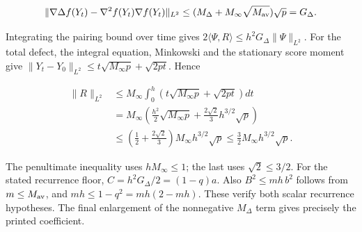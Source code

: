 \documentclass[11pt,a4paper]{article}
\begin{document}
\[\|\nabla\Delta f(Y_t)-\nabla^2f(Y_t)\nabla f(Y_t)\|_{L^2}\le(M_\Delta+M_\infty\sqrt{M_{\rm av}})\sqrt p=G_\Delta.\]

Integrating the pairing bound over time gives \(2\langle\Psi,R\rangle\le h^2G_\Delta\|\Psi\|_{L^2}\). For the total defect, the integral equation, Minkowski and the stationary score moment give \(\|Y_t-Y_0\|_{L^2}\le t\sqrt{M_\infty p}+\sqrt{2pt}\). Hence

\[\begin{aligned}\|R\|_{L^2}&\le M_\infty\int_0^h\left(t\sqrt{M_\infty p}+\sqrt{2pt}\right)dt\\&=M_\infty\left(\frac{h^2}2\sqrt{M_\infty p}+\frac{2\sqrt2}3h^{3/2}\sqrt p\right)\\&\le\left(\frac12+\frac{2\sqrt2}3\right)M_\infty h^{3/2}\sqrt p\le\frac32M_\infty h^{3/2}\sqrt p.\end{aligned}\]

The penultimate inequality uses \(hM_\infty\le1\); the last uses \(\sqrt2\le3/2\). For the stated recurrence floor, \(C=h^2G_\Delta/2=(1-q)a\). Also \(B^2\le mh\,b^2\) follows from \(m\le M_{\rm av}\), and \(mh\le1-q^2=mh(2-mh)\). These verify both scalar recurrence hypotheses. The final enlargement of the nonnegative \(M_\Delta\) term gives precisely the printed coefficient.
\end{document}
